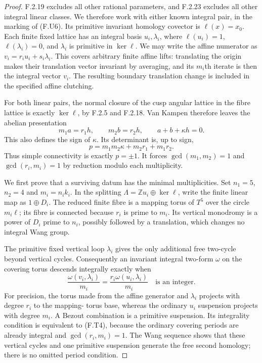 \begin{proof}
F.2.19 excludes all other rational parameters, and F.2.23
excludes all other integral linear classes.
We therefore work with either known integral pair, in the
marking of (F.U6).  Its primitive invariant homology
covector is $\ell(x)=x_0$.
Each finite fixed lattice has an integral basis
$u_i,\lambda_i$, where $\ell(u_i)=1$,
$\ell(\lambda_i)=0$, and $\lambda_i$ is primitive in
$\ker\ell$.
We may write the affine numerator as
$v_i=r_i u_i+s_i\lambda_i$.
This covers arbitrary finite affine lifts: translating the
origin makes their translation vector invariant by averaging,
and its $m_i$th iterate is then the integral vector $v_i$.
The resulting boundary translation change is included in the
specified affine clutching.

For both linear pairs, the normal closure of the cusp angular
lattice in the fibre lattice is exactly $\ker\ell$, by
F.2.5 and F.2.18.  Van Kampen therefore leaves the abelian
presentation
\[
 m_1a=r_1h,\qquad m_2b=r_2h,\qquad
 a+b+\kappa h=0.
 \tag{F.T2}
\]
This also defines the sign of $\kappa$.
Its determinant is, up to sign,
\[
 p=m_1m_2\kappa+m_2r_1+m_1r_2.
 \tag{F.T3}
\]
Thus simple connectivity is exactly $p=\pm1$.
It forces $\gcd(m_1,m_2)=1$ and
$\gcd(r_i,m_i)=1$ by reduction modulo each multiplicity.

We first prove that a surviving datum has the minimal
multiplicities.  Set $n_1=5$, $n_2=4$ and $m_i=n_i k_i$.
In the splitting $\Lambda=\mathbb Zu_i\oplus\ker\ell$,
write the finite linear map as $1\oplus D_i$.
The reduced finite fibre is a mapping torus of $T^5$ over
the circle $m_i\ell$; its fibre is connected because
$r_i$ is prime to $m_i$.
Its vertical monodromy is a power of $D_i$ prime to $n_i$,
possibly followed by a translation, which changes no
integral Wang group.

The primitive fixed vertical loop $\lambda_i$ gives the
only additional free two-cycle beyond vertical cycles.
Consequently an invariant integral two-form $\omega$ on
the covering torus descends integrally exactly when
\[
 \frac{\omega(v_i,\lambda_i)}{m_i}
       =\frac{r_i\omega(u_i,\lambda_i)}{m_i}
       \quad\text{is an integer}.
 \tag{F.T4}
\]
For precision, the torus made from the affine generator
and $\lambda_i$ projects with degree $r_i$ to the mapping-
torus base, whereas the ordinary $u_i$ suspension projects
with degree $m_i$.  A Bezout combination is a primitive
suspension.  Its integrality condition is equivalent to
(F.T4), because the ordinary covering periods are already
integral and $\gcd(r_i,m_i)=1$.
The Wang sequence shows that these vertical cycles and one
primitive suspension generate the free second homology;
there is no omitted period condition.


\end{proof}
